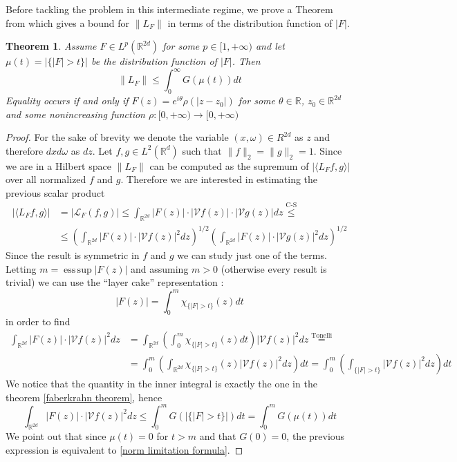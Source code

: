 \documentclass[corpo=11pt, stile=classica, tipotesi=custom,
greek, evenboxes, english]{toptesi}
\numberwithin{equation}{chapter}
\newtheorem{teo}{Theorem}[chapter] %
\theoremstyle{remark}
\newcommand{\R}{\mathbb{R}} %
\newcommand{\V}{\mathcal{V}} %
\renewcommand{\L}{\mathscr{L}} %
\DeclareMathOperator*{\esssup}{ess\,sup}
\begin{document}
Before tackling the problem in this intermediate regime, we prove a Theorem from \cite{nicolatilli_norm} which gives a bound for $\| L_F \|$ in terms of the distribution function of $|F|$.
\begin{teo}\label{norm limitation}
	Assume $F \in L^p(\R^{2d})$ for some $p \in [1,+\infty)$ and let $\mu(t) = |\{|F|>t\}|$ be the distribution function of $|F|$. Then
	\begin{equation}\label{norm limitation formula}
		\| L_F \| \leq \int_0^{\infty} G(\mu(t))dt
	\end{equation}
	Equality occurs if and only if $F(z)=e^{i\theta}\rho(|z-z_0|)$ for some $\theta \in \R$, $z_0 \in \R^{2d}$ and some nonincreasing function $\rho : [0,+\infty) \rightarrow [0,+\infty)$
\end{teo}
\begin{proof}
	For the sake of brevity we denote the variable $(x,\omega) \in R^{2d}$ as $z$ and therefore $dxd\omega$ as $dz$. Let $f,g \in L^2(\R^d)$ such that $\| f \|_2 = \| g \|_2 = 1$.
	{\color{blue} Since we are in a Hilbert space $\| L_F \|$ can be computed as the supremum of $|\langle L_F f,g \rangle|$ over all normalized $f$ and $g$. Therefore we are interested in estimating the previous scalar product}
	\begin{equation}\label{first inequality}
	\begin{aligned}
		| \langle L_F f, g \rangle |  &= | \L_{F}(f,g) | \leq \int_{\R^{2d}} |F(z)| \cdot |\V f(z)| \cdot | \V g(z) | dz \overset{\text{C-S}}{\leq} \\
									  &\leq \left( \int_{\R^{2d}} |F(z)| \cdot |\V f(z)|^2 dz \right)^{1/2} \left( \int_{\R^{2d}} |F(z)| \cdot |\V g(z)|^2 dz \right)^{1/2} 
	\end{aligned}
	\end{equation}
	Since the result is symmetric in $f$ and $g$ we can study just one of the terms. Letting $m = \esssup |F(z)|$ and assuming $m>0$ (otherwise every result is trivial) we can use the ``layer cake'' representation \cite[][Theorem 1.13]{liebloss}:
	\begin{equation*}
		|F(z)| = \int_0^m \chi_{\{|F|>t\}}(z)dt 
	\end{equation*}
	in order to find
	\begin{align*}
		\int_{\R^{2d}} |F(z)| \cdot |\V f(z)|^2 dz &= \int_{\R^{2d}} \left( \int_0^m \chi_{\{|F|>t\}}(z)dt \right) |\V f(z)|^2 dz \overset{\text{Tonelli}}{=}\\
											 &= \int_0^m \left( \int_{\R^{2d}} \chi_{\{|F|>t\}}(z) |\V f(z)|^2 dz \right)dt = \int_0^m \left( \int_{\{|F|>t\}} |\V f(z)|^2 dz \right)dt
	\end{align*}
	We notice that the quantity in the inner integral is exactly the one in the theorem \ref{faberkrahn theorem}, hence
	\begin{equation}\label{limitation with G}
		\int_{\R^{2d}} |F(z)| \cdot |\V f(z)|^2 dz \leq \int_0^m G\left(|\{|F|>t\}|\right)dt = \int_0^m G(\mu(t)) dt
	\end{equation}
	We point out that since $\mu(t) = 0$ for $t > m$ and that $G(0)=0$, the previous expression is equivalent to \eqref{norm limitation formula}.
	

\end{proof}
\end{document}
